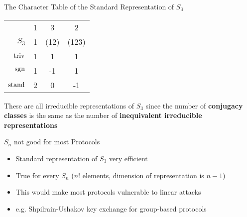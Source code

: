 \begin{frame}{The Character Table of the Standard Representation of $S_3$}
    \large
    \begin{center}
        \begin{tabular}{r | c  c  c}
                        & 1 & 3     & 2     \\
            $S_3$       & 1 & (12)  & (123) \\ \hline \pause
            $\operatorname{triv}$     & 1 & 1     & 1     \\ \pause
            $\operatorname{sgn}$      & 1 & -1    & 1     \\ \pause
            $\operatorname{stand}$    & 2 & 0     & -1
        \end{tabular}
    \end{center}
    
    \pause
    \vspace{2em}
    These are all irreducible representations of $S_3$ since the number of \textbf{conjugacy classes} is the same as the number of \textbf{inequivalent irreducible representations}

\end{frame}

\begin{frame}{$S_n$ not good for most Protocols}
    \large
    \begin{itemize}
        \item Standard representation of $S_3$ very efficient \pause
        \item True for every $S_n$ ($n!$ elements, dimension of representation is $n - 1$) \pause
        \item This would make most protocols vulnerable to linear attacks
        \item e.g. Shpilrain-Ushakov key exchange for group-based protocols
    \end{itemize}

    \vspace{1em}
    {\hspace*{\fill} \cite{khovanov2022monoidal}}
\end{frame}

